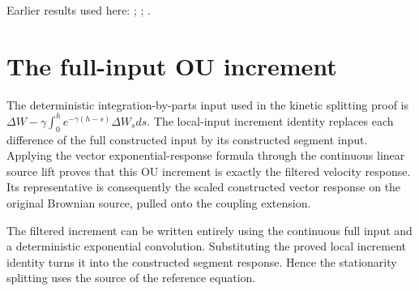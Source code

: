 \documentclass[11pt,a4paper]{article}
\begin{document}
Earlier results used here: \cite[Section~3.17.1]{LangevinLean2026ULASC}; \cite[Section~3.8.16]{LangevinLean2026ULASC}; \cite[Section~3.8.17]{LangevinLean2026ULASC}.

\section{\texorpdfstring{The full-input OU increment}{The full-input OU increment}}


The deterministic integration-by-parts input used in the kinetic splitting proof is \(\Delta W-\gamma\int_0^he^{-\gamma(h-s)}\Delta W_sds\). The local-input increment identity replaces each difference of the full constructed input by its constructed segment input. Applying the vector exponential-response formula through the continuous linear source lift proves that this OU increment is exactly the filtered velocity response. Its representative is consequently the scaled constructed vector response on the original Brownian source, pulled onto the coupling extension.



The filtered increment can be written entirely using the continuous full input and a deterministic exponential convolution. Substituting the proved local increment identity turns it into the constructed segment response. Hence the stationarity splitting uses the source of the reference equation.
\end{document}
